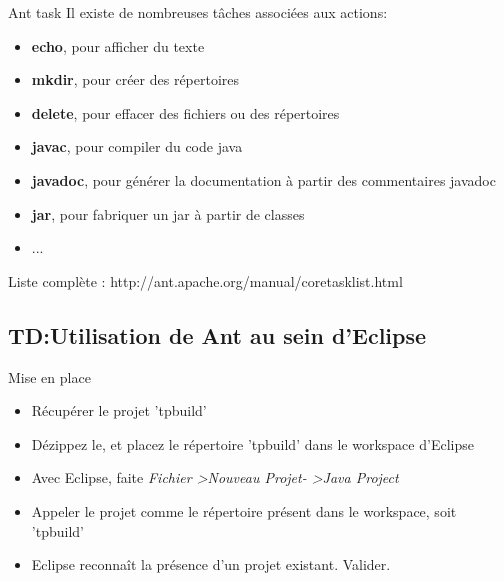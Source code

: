 \documentclass[handout]{beamer}
\begin{document}

\begin{frame}
	\begin{block}{Ant task}
		Il existe de nombreuses tâches associées aux actions:
		\begin{itemize}
			\item \textbf{echo}, pour afficher du texte
			\item \textbf{mkdir}, pour créer des répertoires
			\item \textbf{delete}, pour effacer des fichiers ou des répertoires
			\item \textbf{javac}, pour compiler du code java
			\item \textbf{javadoc}, pour générer la documentation à partir des commentaires javadoc
			\item \textbf{jar}, pour fabriquer un jar à partir de classes
			\item ...
		\end{itemize}
		Liste complète : http://ant.apache.org/manual/coretasklist.html
	\end{block}
\end{frame}

\subsection{TD:Utilisation de Ant au sein d'Eclipse}

\begin{frame}
	\begin{block}{Mise en place}
	 	\begin{itemize}
	 		\item Récupérer le projet 'tpbuild'
			\item Dézippez le, et placez le répertoire 'tpbuild' dans le workspace d'Eclipse
			\item Avec Eclipse, faite \textit{Fichier \textgreater Nouveau Projet- \textgreater Java Project}
			\item Appeler le projet comme le répertoire présent dans le workspace, soit 'tpbuild'
			\item Eclipse reconnaît la présence d'un projet existant. Valider.
	 	\end{itemize}
	\end{block}
\end{frame}
\end{document}
